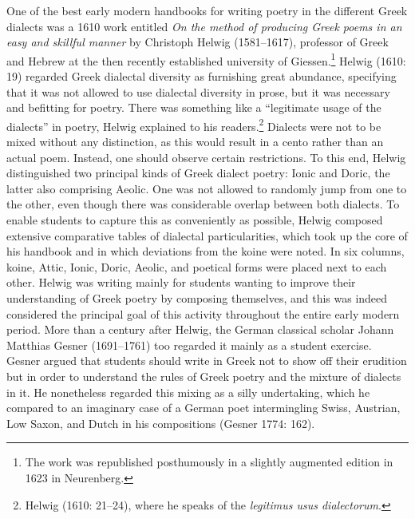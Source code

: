 \documentclass[12pt]{article}
\newenvironment{styleStandard}{\renewcommand\baselinestretch{1.25}\setlength\leftskip{0in}\setlength\rightskip{0in}\setlength\parindent{0.1972in}\setlength\parfillskip{0pt plus 1fil}\setlength\parskip{0in plus 1pt}\writerlistparindent\writerlistleftskip\leavevmode\normalfont\normalsize\writerlistlabel\ignorespaces}{\unskip\vspace{0in plus 1pt}\par}
\newcommand\writerlistleftskip{}
\newcommand\writerlistparindent{}
\newcommand\writerlistlabel{}
\begin{document}
\begin{styleStandard}
One of the best early modern handbooks for writing poetry in the different Greek dialects was a 1610 work entitled \textit{On the method of producing Greek poems in an easy and skillful manner} by Christoph Helwig (1581–1617), professor of Greek and Hebrew at the then recently established university of Giessen.\footnote{ The work was republished posthumously in a slightly augmented edition in 1623 in Neurenberg.} Helwig (1610: 19) regarded Greek dialectal diversity as furnishing great abundance, specifying that it was not allowed to use dialectal diversity in prose, but it was necessary and befitting for poetry. There was something like a “legitimate usage of the dialects” in poetry, Helwig explained to his readers.\footnote{ Helwig (1610: 21–24), where he speaks of the \textit{legitimus usus dialectorum}.} Dialects were not to be mixed without any distinction, as this would result in a cento rather than an actual poem. Instead, one should observe certain restrictions. To this end, Helwig distinguished two principal kinds of Greek dialect poetry: Ionic and Doric, the latter also comprising Aeolic. One was not allowed to randomly jump from one to the other, even though there was considerable overlap between both dialects. To enable students to capture this as conveniently as possible, Helwig composed extensive comparative tables of dialectal particularities, which took up the core of his handbook and in which deviations from the koine were noted. In six columns, koine, Attic, Ionic, Doric, Aeolic, and poetical forms were placed next to each other. Helwig was writing mainly for students wanting to improve their understanding of Greek poetry by composing themselves, and this was indeed considered the principal goal of this activity throughout the entire early modern period. More than a century after Helwig, the German classical scholar Johann Matthias Gesner (1691–1761) too regarded it mainly as a student exercise. Gesner argued that students should write in Greek not to show off their erudition but in order to understand the rules of Greek poetry and the mixture of dialects in it. He nonetheless regarded this mixing as a silly undertaking, which he compared to an imaginary case of a German poet intermingling Swiss, Austrian, Low Saxon, and Dutch in his compositions (Gesner 1774: 162).
\end{styleStandard}
\end{document}
